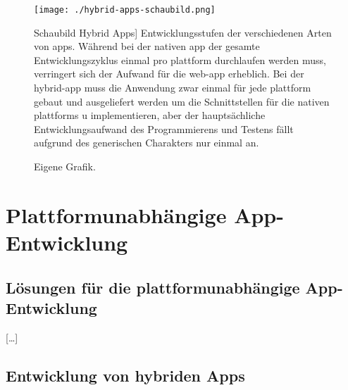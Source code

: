\begin{figure}[h!]
\centering
\texttt{[image: ./hybrid-apps-schaubild.png]}
	\caption
		[Schaubild Hybrid Apps]
		{Entwicklungsstufen der verschiedenen Arten von \glspl{app}. Während bei der nativen \gls{app} der gesamte Entwicklungszyklus einmal pro \gls{plattform} durchlaufen werden muss, verringert sich der Aufwand für die \gls{web-app} erheblich. Bei der \gls{hybrid-app} muss die Anwendung zwar einmal für jede \gls{plattform} gebaut und ausgeliefert werden um die Schnittstellen für die nativen \glspl{plattform} u implementieren, aber der hauptsächliche Entwicklungsaufwand des Programmierens und Testens fällt aufgrund des generischen Charakters nur einmal an.}
	\label{fig:hybrid-apps-schaubild}
	\imagesourcefont
	\vspace{\imagesourcespace}
	\imagesourcefont{}
	\caption*{\imagesourcelabel Eigene Grafik.}
\end{figure}

\section{Plattformunabhängige App-Entwicklung}



\subsection[Lösungen]{Lösungen für die plattformunabhängige App-Entwicklung}

[\ldots]%



\subsection{Entwicklung von hybriden Apps}\label{sec:hybrid}


